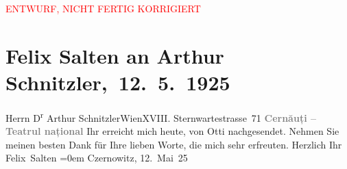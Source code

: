 
\begin{center}
            \textcolor{red}{ENTWURF, NICHT FERTIG KORRIGIERT}
                      \end{center}
            
         
         \renewcommand{\erwaehntePersonen}{Personen: Felix Salten, Ottilie Salten}
         \renewcommand{\erwaehnteOrte}{Orte: Czernowitz, Olha-Kobyljanska-Stadttheater, Sternwartestraße 71, Wien}
         \renewcommand{\erwaehnteWerke}{}
               \section[ Felix Salten an Arthur Schnitzler, 12. 5. 1925]{ Felix Salten an Arthur Schnitzler, 12. 5. 1925}\nopagebreak{}\rehead{ }\begin{ledgroupsized}[t]{13cm}\normalsize\beginnumbering \toendnotes[C]{\smallbreak\pagebreak[2]} 
\toendnotes[C]{\smallbreak}\pstart{}{\pb}Herrn D\textsuperscript{r} Arthur Schnitzler\pend{}\pstart{}Wien\pend{}\pstart{}XVIII. Sternwartestrasse 71\pend{}{\bigskip}\pstart
           \noindent{}\centering{}{\pb}\textcolor{gray}{\textbf{Cernăuți – Teatrul național}}\pend
           \pstart
           {\pb}Ihr \label{K_L03584-1v}\label{K_L03584-1h} erreicht mich heute, von Otti nachgesendet. Nehmen Sie meinen besten Dank für Ihre
               lieben Worte, die mich sehr erfreuten.\pend
           \pstart
           Herzlich Ihr {\\[\baselineskip]}\spacefill\mbox{Felix Salten}\pend
           \leftskip=0em{}\pstart
           Czernowitz, 12. Mai 25\pend
           
         
         \endnumbering{}\end{ledgroupsized}  \newcommand{\dateiname}{L03584}\newcommand{\titel}{Felix Salten an Arthur Schnitzler, 12. 5. 1925}\newcommand{\editorInnen}{Martin Anton Müller und Laura Untner}
      